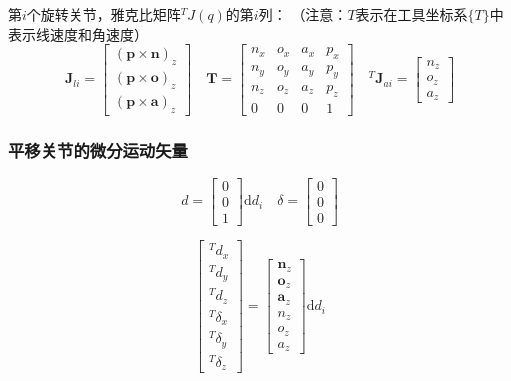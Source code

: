 第$i$个旋转关节，雅克比矩阵${}^TJ(q)$的第$i$列：
\textcolor{whusakura}{（注意：$T$表示在工具坐标系$\{T\}$中表示线速度和角速度）}
$$
\boldsymbol{J}_{li} = \begin{bmatrix}
(\boldsymbol{p} \times \boldsymbol{n})_z \\
(\boldsymbol{p} \times \boldsymbol{o})_z \\
(\boldsymbol{p} \times \boldsymbol{a})_z
\end{bmatrix}
\quad
\boldsymbol{T} = \begin{bmatrix}
n_x & o_x & a_x & p_x \\
n_y & o_y & a_y & p_y \\
n_z & o_z & a_z & p_z \\
0 & 0 & 0 & 1
\end{bmatrix}
\quad
{}^T\boldsymbol{J}_{ai} = \begin{bmatrix}
n_z \\
o_z \\
a_z
\end{bmatrix}
$$

\subsubsection{平移关节的微分运动矢量}
$$
d = \begin{bmatrix}0 \\ 0 \\ 1\end{bmatrix}\mathrm{d}d_i \quad \delta = \begin{bmatrix}0 \\ 0 \\ 0\end{bmatrix}
$$

$$
\begin{bmatrix}
{}^T d_x \\
{}^T d_y \\
{}^T d_z \\
{}^T \delta_x \\
{}^T \delta_y \\
{}^T \delta_z
\end{bmatrix}
=
\begin{bmatrix}
\boldsymbol{n}_z \\
\boldsymbol{o}_z \\
\boldsymbol{a}_z \\
n_z \\
o_z \\
a_z
\end{bmatrix}
\mathrm{d}d_i
$$

